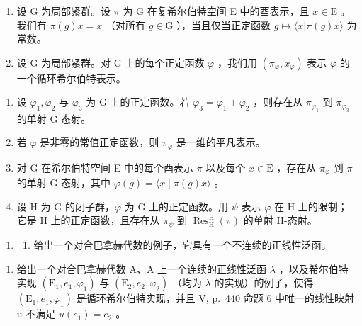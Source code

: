 \exercisesection{}

\begin{enumerate}
\def\labelenumi{\arabic{enumi})}
\item
  设 G 为局部紧群。设 \(\pi\) 为 G 在复希尔伯特空间 E 中的酉表示，且 \(x \in \mathrm{E}\) 。我们有 \(\pi(g)x = x\) （对所有 \(g \in \mathrm{G}\) ），当且仅当正定函数 \(g \mapsto \langle x | \pi(g)x \rangle\) 为常数。
\item
  设 G 为局部紧群。对 G 上的每个正定函数 \(\varphi\) ，我们用 \((\pi_{\varphi}, x_{\varphi})\) 表示 \(\varphi\) 的一个循环希尔伯特表示。
\end{enumerate}

\begin{enumerate}
\def\labelenumi{\alph{enumi})}
\item
  设 \(\varphi_1, \varphi_2\) 与 \(\varphi_3\) 为 G 上的正定函数。若 \(\varphi_3 = \varphi_1 + \varphi_2\) ，则存在从 \(\pi_{\varphi_1}\) 到 \(\pi_{\varphi_3}\) 的单射 G-态射。
\item
  若 \(\varphi\) 是非零的常值正定函数，则 \(\pi_{\varphi}\) 是一维的平凡表示。
\item
  对 G 在希尔伯特空间 E 中的每个酉表示 \(\pi\) 以及每个 \(x \in \mathrm{E}\) ，存在从 \(\pi_{\varphi}\) 到 \(\pi\) 的单射 G-态射，其中 \(\varphi(g) = \langle x \mid \pi(g)x \rangle\) 。
\item
  设 H 为 G 的闭子群，\(\varphi\) 为 G 上的正定函数。用 \(\psi\) 表示 \(\varphi\) 在 H 上的限制；它是 H 上的正定函数，且存在从 \(\pi_{\psi}\) 到 \(\operatorname{Res}_{\mathrm{H}}^{\mathrm{H}}(\pi)\) 的单射 H-态射。
\end{enumerate}

\begin{enumerate}
\def\labelenumi{\arabic{enumi})}
\setcounter{enumi}{2}
\tightlist
\item
  \begin{enumerate}
  \def\labelenumii{\alph{enumii})}
  \tightlist
  \item
  给出一个对合巴拿赫代数的例子，它具有一个不连续的正线性泛函。
  \end{enumerate}
\end{enumerate}

\begin{enumerate}
\def\labelenumi{\alph{enumi})}
\setcounter{enumi}{1}
\tightlist
\item
  给出一个对合巴拿赫代数 A、A 上一个连续的正线性泛函 \(\lambda\) ，以及希尔伯特实现 \((\mathrm{E}_{1}, e_{1}, \varphi_{1})\) 与 \((\mathrm{E}_{2}, e_{2}, \varphi_{2})\) （均为 \(\lambda\) 的实现）的例子，使得 \((\mathrm{E}_{1}, e_{1}, \varphi_{1})\) 是循环希尔伯特实现，并且 V, p.~440 命题 6 中唯一的线性映射 u 不满足 \(u(e_{1}) = e_{2}\) 。
\end{enumerate}

